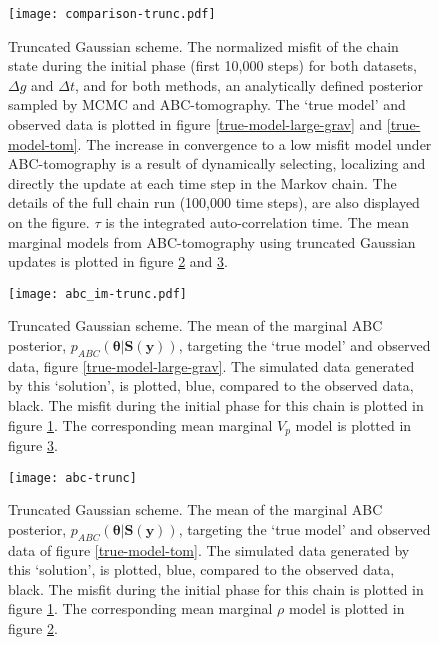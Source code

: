 \begin{figure}[H]
	\centering
	\texttt{[image: comparison-trunc.pdf]}
	\caption{Truncated Gaussian scheme. The normalized misfit of the chain state during the initial phase (first 10,000 steps) for both datasets, $\Delta g$ and $\Delta t$, and for both methods, an analytically defined posterior sampled by MCMC and ABC-tomography. The `true model' and observed data is plotted in figure \ref{true-model-large-grav} and \ref{true-model-tom}. The increase in convergence to a low misfit model under ABC-tomography is a result of dynamically selecting, localizing and directly the update at each time step in the Markov chain. The details of the full chain run (100,000 time steps), are also displayed on the figure. $\tau$ is the integrated auto-correlation time. The mean marginal models from ABC-tomography using truncated Gaussian updates is plotted in figure \ref{grav-trunc} and \ref{tom-trunc}.}
	\label{comparison-trunc}
\end{figure}

\begin{figure}[H]
	\centering
	\texttt{[image: abc\_im-trunc.pdf]}
	\caption{Truncated Gaussian scheme. The mean of the marginal ABC posterior, $p_{ABC}(\bm{\theta}|\bm{S}(\bm{y}))$, targeting the `true model' and observed data, figure \ref{true-model-large-grav}. The simulated data generated by this `solution', is plotted, blue, compared to the observed data, black. The misfit during the initial phase for this chain is plotted in figure \ref{comparison-trunc}. The corresponding mean marginal $V_p$ model is plotted in figure \ref{tom-trunc}.}
	\label{grav-trunc}
\end{figure}

\begin{figure}[H]
	\centering
	\texttt{[image: abc-trunc]}
	\caption{Truncated Gaussian scheme. The mean of the marginal ABC posterior, $p_{ABC}(\bm{\theta}|\bm{S}(\bm{y}))$, targeting the `true model' and observed data of figure \ref{true-model-tom}. The simulated data generated by this `solution', is plotted, blue, compared to the observed data, black. The misfit during the initial phase for this chain is plotted in figure \ref{comparison-trunc}. The corresponding mean marginal $\rho$ model is plotted in figure \ref{grav-trunc}.}
	\label{tom-trunc}
\end{figure}
